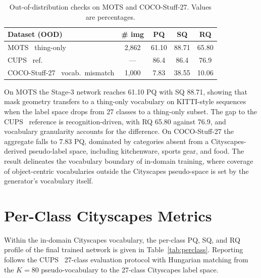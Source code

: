 \documentclass{article}
\begin{document}
\begin{table}[!htbp]
\caption{Out-of-distribution checks on MOTS and COCO-Stuff-27. Values are percentages.}
\label{tab:cocooo}
\centering
\footnotesize
\setlength{\tabcolsep}{6pt}
\begin{tabular}{l c c c c}
\toprule
Dataset (OOD) & \# img & PQ & SQ & RQ \\
\midrule
MOTS~\cite{voigtlaender2019mots} thing-only & 2{,}862 & 61.10 & 88.71 & 65.80 \\
\quad CUPS~\cite{hahn2025cups} ref. & --- & 86.4 & 86.4 & 76.9 \\
COCO-Stuff-27~\cite{caesar2018coco} vocab.\ mismatch & 1{,}000 & \phantom{0}7.83 & 38.55 & 10.06 \\
\bottomrule
\end{tabular}
\end{table}

On MOTS the Stage-3 network reaches 61.10 PQ with SQ 88.71, showing that mask geometry transfers to a thing-only vocabulary on KITTI-style sequences when the label space drops from 27 classes to a thing-only subset. The gap to the CUPS~\cite{hahn2025cups} reference is recognition-driven, with RQ 65.80 against 76.9, and vocabulary granularity accounts for the difference. On COCO-Stuff-27 the aggregate falls to 7.83 PQ, dominated by categories absent from a Cityscapes-derived pseudo-label space, including kitchenware, sports gear, and food. The result delineates the vocabulary boundary of in-domain training, where coverage of object-centric vocabularies outside the Cityscapes pseudo-space is set by the generator's vocabulary itself.

\section{Per-Class Cityscapes Metrics}
\label{sec:supp:perclass}

Within the in-domain Cityscapes vocabulary, the per-class PQ, SQ, and RQ profile of the final trained network is given in Table~\ref{tab:perclass}. Reporting follows the CUPS~\cite{hahn2025cups} 27-class evaluation protocol with Hungarian matching from the $K{=}80$ pseudo-vocabulary to the 27-class Cityscapes label space.
\end{document}
